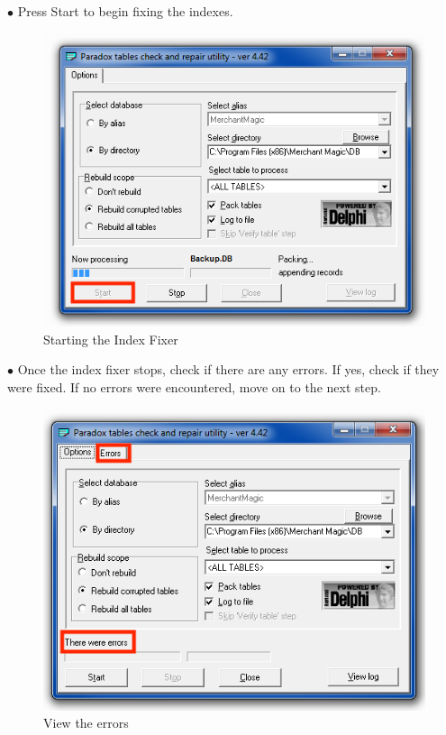 \documentclass[a4paper, 11pt]{article}
\begin{document}
\pagebreak

\vspace*{\fill}
$\bullet$ Press Start to begin fixing the indexes.

\begin{figure}[h]
    \centering
     \includegraphics[width=\textwidth]{capture 21}
    \caption{Starting the Index Fixer}
\end{figure}
\vspace*{\fill}

\pagebreak

\vspace*{\fill}
$\bullet$ Once the index fixer stops, check if there are any errors. If yes, check if they were fixed. If no errors were encountered, move on to the next step.

\begin{figure}[h]
    \centering
     \includegraphics[width=\textwidth]{capture 22}
    \caption{View the errors}
\end{figure}
\vspace*{\fill}
\end{document}
